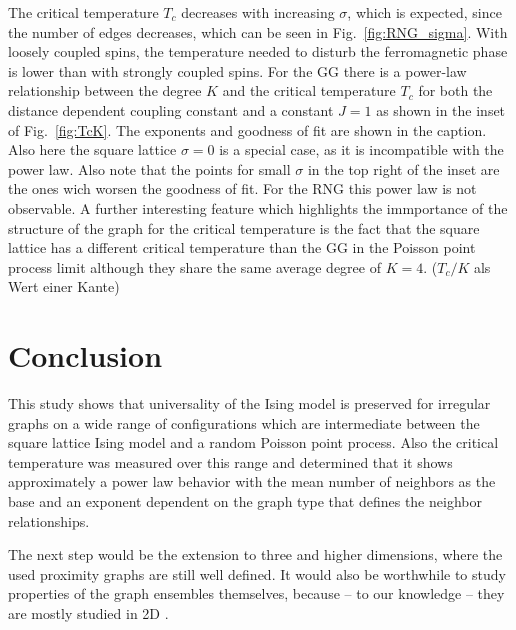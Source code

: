 \documentclass[pre,twocolumn,groupedaddress,showpacs,showkeys,amsmath,amssymb,floatfix]{revtex4-1}
\begin{document}
        The critical temperature $T_c$ decreases with increasing $\sigma$, which
        is expected, since the number of edges decreases, which can be seen in
        Fig.~\ref{fig:RNG_sigma}. With loosely coupled spins, the temperature
        needed to disturb the ferromagnetic phase is lower than with strongly coupled
        spins.
        For the GG there is a power-law relationship between the degree $K$ and
        the critical temperature $T_c$ for both the distance dependent coupling constant
        and a constant $J=1$ as shown in the inset of Fig.~\ref{fig:TcK}. The exponents
        and goodness of fit are shown in the caption.
        Also here the square lattice $\sigma = 0$ is a special case, as it is incompatible with the
        power law. Also note that the points for small $\sigma$ in the top right of the
        inset are the ones wich worsen the goodness of fit. For the RNG this power law
        is not observable.
        A further interesting feature which highlights the immportance of the structure
        of the graph for the critical temperature is the fact that the square lattice
        has a different critical temperature than the GG in the Poisson point process
        limit although they share the same average degree of $K=4$. ($T_c/K$ als Wert einer Kante)


    \section{Conclusion}
        \label{sec:conclusion}
        This study shows that universality of the Ising model is preserved for
        irregular graphs on a wide range of configurations which are intermediate
        between the square lattice Ising model and a random Poisson point process.
        Also the critical temperature was measured over this range and determined
        that it shows approximately a power law behavior with the mean
        number of neighbors as the base and an exponent dependent on the
        graph type that defines the neighbor relationships.

        The next step would be the extension to three and higher
        dimensions, where the used proximity graphs are still well defined. It
        would also be worthwhile to study properties of the graph ensembles themselves,
        because -- to our knowledge -- they are mostly studied in 2D \cite{RNGCell}.
\end{document}
